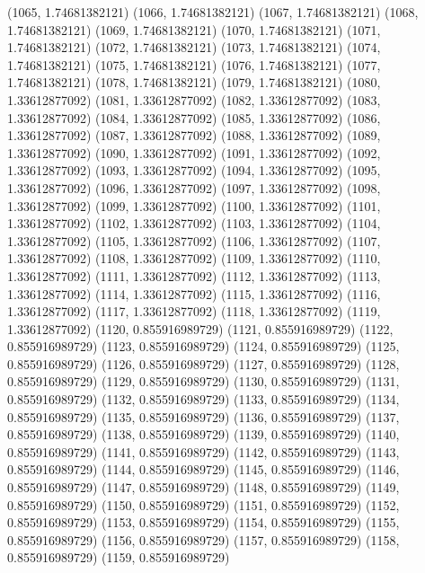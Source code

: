 {					(1065, 1.74681382121)
					(1066, 1.74681382121)
					(1067, 1.74681382121)
					(1068, 1.74681382121)
					(1069, 1.74681382121)
					(1070, 1.74681382121)
					(1071, 1.74681382121)
					(1072, 1.74681382121)
					(1073, 1.74681382121)
					(1074, 1.74681382121)
					(1075, 1.74681382121)
					(1076, 1.74681382121)
					(1077, 1.74681382121)
					(1078, 1.74681382121)
					(1079, 1.74681382121)
					(1080, 1.33612877092)
					(1081, 1.33612877092)
					(1082, 1.33612877092)
					(1083, 1.33612877092)
					(1084, 1.33612877092)
					(1085, 1.33612877092)
					(1086, 1.33612877092)
					(1087, 1.33612877092)
					(1088, 1.33612877092)
					(1089, 1.33612877092)
					(1090, 1.33612877092)
					(1091, 1.33612877092)
					(1092, 1.33612877092)
					(1093, 1.33612877092)
					(1094, 1.33612877092)
					(1095, 1.33612877092)
					(1096, 1.33612877092)
					(1097, 1.33612877092)
					(1098, 1.33612877092)
					(1099, 1.33612877092)
					(1100, 1.33612877092)
					(1101, 1.33612877092)
					(1102, 1.33612877092)
					(1103, 1.33612877092)
					(1104, 1.33612877092)
					(1105, 1.33612877092)
					(1106, 1.33612877092)
					(1107, 1.33612877092)
					(1108, 1.33612877092)
					(1109, 1.33612877092)
					(1110, 1.33612877092)
					(1111, 1.33612877092)
					(1112, 1.33612877092)
					(1113, 1.33612877092)
					(1114, 1.33612877092)
					(1115, 1.33612877092)
					(1116, 1.33612877092)
					(1117, 1.33612877092)
					(1118, 1.33612877092)
					(1119, 1.33612877092)
					(1120, 0.855916989729)
					(1121, 0.855916989729)
					(1122, 0.855916989729)
					(1123, 0.855916989729)
					(1124, 0.855916989729)
					(1125, 0.855916989729)
					(1126, 0.855916989729)
					(1127, 0.855916989729)
					(1128, 0.855916989729)
					(1129, 0.855916989729)
					(1130, 0.855916989729)
					(1131, 0.855916989729)
					(1132, 0.855916989729)
					(1133, 0.855916989729)
					(1134, 0.855916989729)
					(1135, 0.855916989729)
					(1136, 0.855916989729)
					(1137, 0.855916989729)
					(1138, 0.855916989729)
					(1139, 0.855916989729)
					(1140, 0.855916989729)
					(1141, 0.855916989729)
					(1142, 0.855916989729)
					(1143, 0.855916989729)
					(1144, 0.855916989729)
					(1145, 0.855916989729)
					(1146, 0.855916989729)
					(1147, 0.855916989729)
					(1148, 0.855916989729)
					(1149, 0.855916989729)
					(1150, 0.855916989729)
					(1151, 0.855916989729)
					(1152, 0.855916989729)
					(1153, 0.855916989729)
					(1154, 0.855916989729)
					(1155, 0.855916989729)
					(1156, 0.855916989729)
					(1157, 0.855916989729)
					(1158, 0.855916989729)
					(1159, 0.855916989729)
}
